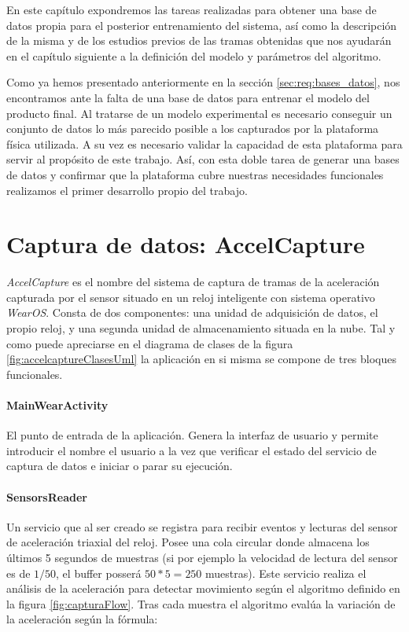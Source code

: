 
En este capítulo expondremos las tareas realizadas para obtener una base de datos propia para el posterior entrenamiento del sistema, así como la descripción de la misma y de los estudios previos de las tramas obtenidas que nos ayudarán en el capítulo siguiente a la definición del modelo y parámetros del algoritmo.

Como ya hemos presentado anteriormente en la sección \ref{sec:req:bases_datos}, nos encontramos ante la falta de una base de datos para entrenar el modelo del producto final. Al tratarse de un modelo experimental es necesario conseguir un conjunto de datos lo más parecido posible a los capturados por la plataforma física utilizada. A su vez es necesario validar la capacidad de esta plataforma para servir al propósito de este trabajo. Así, con esta doble tarea de generar una bases de datos y confirmar que la plataforma cubre nuestras necesidades funcionales realizamos el primer desarrollo propio del trabajo.

\section{Captura de datos: AccelCapture}\label{sub:imp:accelcapture}

\textit{AccelCapture} es el nombre del sistema de captura de tramas de la aceleración capturada por el sensor situado en un reloj inteligente con sistema operativo \textit{WearOS}. Consta de dos componentes: una unidad de adquisición de datos, el propio reloj, y una segunda unidad de almacenamiento situada en la nube. Tal y como puede apreciarse en el diagrama de clases de la figura \ref{fig:accelcaptureClasesUml} la aplicación en si misma se compone de tres bloques funcionales.


\paragraph{MainWearActivity}
El punto de entrada de la aplicación. Genera la interfaz de usuario y permite introducir el nombre el usuario a la vez que verificar el estado del servicio de captura de datos e iniciar o parar su ejecución.

\paragraph{SensorsReader}
Un servicio que al ser creado se registra para recibir eventos y lecturas del sensor de aceleración triaxial del reloj. Posee una cola circular donde almacena los últimos 5 segundos de muestras (si por ejemplo la velocidad de lectura del sensor es de $1/50$, el buffer posserá $50 * 5 = 250$ muestras).
Este servicio realiza el análisis de la aceleración para detectar movimiento según el algoritmo definido en la figura \ref{fig:capturaFlow}. Tras cada muestra el algoritmo evalúa la variación de la aceleración según la fórmula: 

